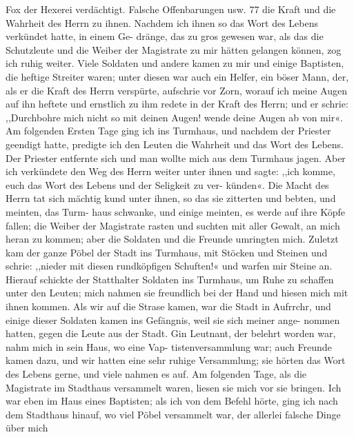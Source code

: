 {%
Fox der Hexerei verdächtigt. Falsche Offenbarungen usw. 77
die Kraft und die Wahrheit des Herrn zu ihnen. Nachdem ich
ihnen so das Wort des Lebens verkündet hatte, in einem Ge-
dränge, das zu gros gewesen war, als das die Schutzleute und
die Weiber der Magistrate zu mir hätten gelangen können, zog
ich ruhig weiter. Viele Soldaten und andere kamen zu mir und
einige Baptisten, die heftige Streiter waren; unter diesen war
auch ein Helfer, ein böser Mann, der, als er die Kraft des Herrn
verspürte, aufschrie vor Zorn, worauf ich meine Augen auf ihn
heftete und ernstlich zu ihm redete in der Kraft des Herrn; und
er schrie: ,,Durchbohre mich nicht so mit deinen Augen! wende
deine Augen ab von mir«.
Am folgenden Ersten Tage ging ich ins Turmhaus, und
nachdem der Priester geendigt hatte, predigte ich den Leuten
die Wahrheit und das Wort des Lebens. Der Priester entfernte
sich und man wollte mich aus dem Turmhaus jagen. Aber ich
verkündete den Weg des Herrn weiter unter ihnen und sagte:
,,ich komme, euch das Wort des Lebens und der Seligkeit zu ver-
künden«. Die Macht des Herrn tat sich mächtig kund unter
ihnen, so das sie zitterten und bebten, und meinten, das Turm-
haus schwanke, und einige meinten, es werde auf ihre Köpfe fallen;
die Weiber der Magistrate rasten und suchten mit aller Gewalt,
an mich heran zu kommen; aber die Soldaten und die Freunde
umringten mich. Zuletzt kam der ganze Pöbel der Stadt ins
Turmhaus, mit Stöcken und Steinen und schrie: ,,nieder mit
diesen rundköpfigen Schuften!« und warfen mir Steine an.
Hierauf schickte der Statthalter Soldaten ins Turmhaus, um
Ruhe zu schaffen unter den Leuten; mich nahmen sie freundlich
bei der Hand und hiesen mich mit ihnen kommen. Als wir
auf die Strase kamen, war die Stadt in Aufrrchr, und einige
dieser Soldaten kamen ins Gefängnis, weil sie sich meiner ange-
nommen hatten, gegen die Leute aus der Stadt. Gin Leutnant,
der belehrt worden war, nahm mich in sein Haus, wo eine Vap-
tistenversammlung war; auch Freunde kamen dazu, und wir hatten
eine sehr ruhige Versammlung; sie hörten das Wort des Lebens
gerne, und viele nahmen es auf. Am folgenden Tage, als die
Magistrate im Stadthaus versammelt waren, liesen sie mich vor
sie bringen. Ich war eben im Haus eines Baptisten; als ich
von dem Befehl hörte, ging ich nach dem Stadthaus hinauf, wo
viel Pöbel versammelt war, der allerlei falsche Dinge über mich


}
